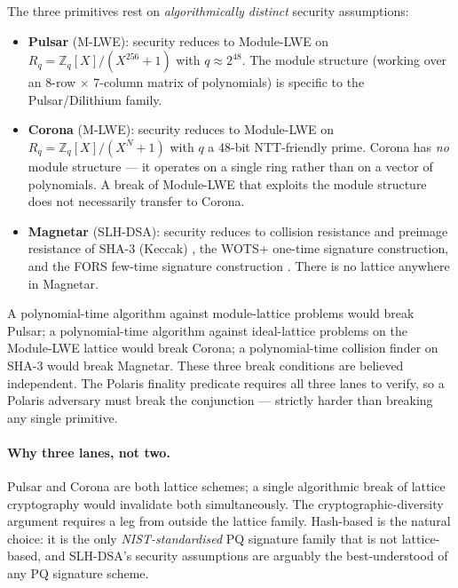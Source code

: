 The three primitives rest on \emph{algorithmically distinct}
security assumptions:
\begin{itemize}[leftmargin=2em,nosep]
  \item \textbf{Pulsar} (M-LWE): security reduces to Module-LWE
        \cite{mlwe,dilithium} on
        $R_q = \mathbb{Z}_q[X]/(X^{256}+1)$ with $q \approx 2^{48}$.
        The module structure (working over an 8-row $\times$ 7-column
        matrix of polynomials) is specific to the
        Pulsar/Dilithium family.
  \item \textbf{Corona} (M-LWE): security reduces to Module-LWE
        \cite{regev2009,lp104corona} on
        $R_q = \mathbb{Z}_q[X]/(X^N+1)$ with $q$ a 48-bit
        NTT-friendly prime. Corona has \emph{no} module structure
        --- it operates on a single ring rather than on a vector
        of polynomials. A break of Module-LWE that exploits the
        module structure does not necessarily transfer to Corona.
  \item \textbf{Magnetar} (SLH-DSA): security reduces to collision
        resistance and preimage resistance of SHA-3 (Keccak)
        \cite{keccak-keccak}, the WOTS+ one-time signature
        construction, and the FORS few-time signature construction
        \cite{sphincs,fips205}. There is no lattice anywhere in
        Magnetar.
\end{itemize}

A polynomial-time algorithm against module-lattice problems would
break Pulsar; a polynomial-time algorithm against ideal-lattice
problems on the Module-LWE lattice would break Corona; a polynomial-time
collision finder on SHA-3 would break Magnetar. These three break
conditions are believed independent. The Polaris finality predicate
requires all three lanes to verify, so a Polaris adversary must
break the conjunction --- strictly harder than breaking any single
primitive.

\paragraph{Why three lanes, not two.} Pulsar and Corona are both
lattice schemes; a single algorithmic break of lattice cryptography
would invalidate both simultaneously. The cryptographic-diversity
argument requires a leg from outside the lattice family. Hash-based
is the natural choice: it is the only \emph{NIST-standardised}
PQ signature family that is not lattice-based, and SLH-DSA's
security assumptions are arguably the best-understood of any
PQ signature scheme.

